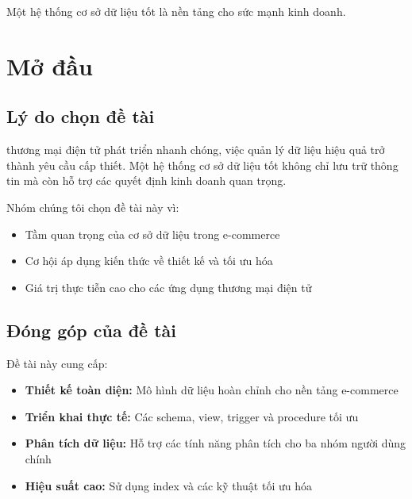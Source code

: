 \begin{savequote}[75mm]
Một hệ thống cơ sở dữ liệu tốt là nền tảng cho sức mạnh kinh doanh.
\end{savequote}

\chapter{Mở đầu}

\section{Lý do chọn đề tài}

 thương mại điện tử phát triển nhanh chóng, việc quản lý dữ liệu hiệu quả trở thành yêu cầu cấp thiết. Một hệ thống cơ sở dữ liệu tốt không chỉ lưu trữ thông tin mà còn hỗ trợ các quyết định kinh doanh quan trọng.

Nhóm chúng tôi chọn đề tài này vì:
\begin{itemize}
    \item Tầm quan trọng của cơ sở dữ liệu trong e-commerce
    \item Cơ hội áp dụng kiến thức về thiết kế và tối ưu hóa
    \item Giá trị thực tiễn cao cho các ứng dụng thương mại điện tử
\end{itemize}

\section{Đóng góp của đề tài}

Đề tài này cung cấp:

\begin{itemize}
    \item \textbf{Thiết kế toàn diện:} Mô hình dữ liệu hoàn chỉnh cho nền tảng e-commerce
    \item \textbf{Triển khai thực tế:} Các schema, view, trigger và procedure tối ưu
    \item \textbf{Phân tích dữ liệu:} Hỗ trợ các tính năng phân tích cho ba nhóm người dùng chính
    \item \textbf{Hiệu suất cao:} Sử dụng index và các kỹ thuật tối ưu hóa
\end{itemize}
